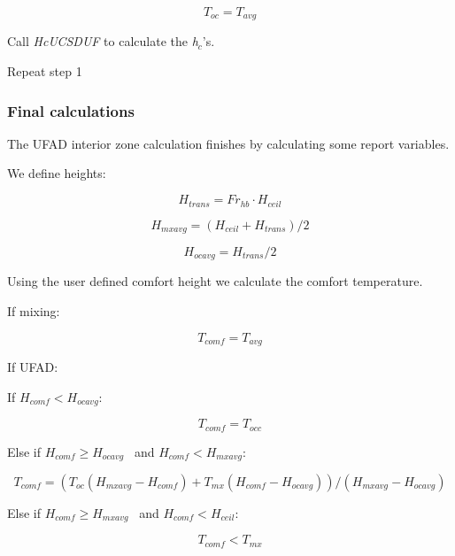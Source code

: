 \begin{equation}
{T_{oc}} = {T_{avg}}
\end{equation}

Call \emph{HcUCSDUF} to calculate the \emph{h\(_{c}\)}'s.

Repeat step 1

\subsubsection{Final calculations}\label{final-calculations-1}

The UFAD interior zone calculation finishes by calculating some report variables.

We define heights:

\begin{equation}
{H_{trans}} = F{r_{hb}} \cdot {H_{ceil}}
\end{equation}

\begin{equation}
{H_{mxavg}} = \left( {{H_{ceil}} + {H_{trans}}} \right)/2
\end{equation}

\begin{equation}
{H_{ocavg}} = {H_{trans}}/2
\end{equation}

Using the user defined comfort height we calculate the comfort temperature.

If mixing:

\begin{equation}
{T_{comf}} = {T_{avg}}
\end{equation}

If UFAD:

If \({H_{comf}} < {H_{ocavg}}\):

\begin{equation}
{T_{comf}} = {T_{occ}}
\end{equation}

Else if \({H_{comf}} \ge {H_{ocavg}}\) ~and \({H_{comf}} < {H_{mxavg}}\):

\begin{equation}
{T_{comf}} = \left( {{T_{oc}}\left( {{H_{mxavg}} - {H_{comf}}} \right) + {T_{mx}}\left( {{H_{comf}} - {H_{ocavg}}} \right)} \right)/\left( {{H_{mxavg}} - {H_{ocavg}}} \right)
\end{equation}

Else if \({H_{comf}} \ge {H_{mxavg}}\) ~and \({H_{comf}} < {H_{ceil}}\):

\begin{equation}
{T_{comf}} < {T_{mx}}
\end{equation}

